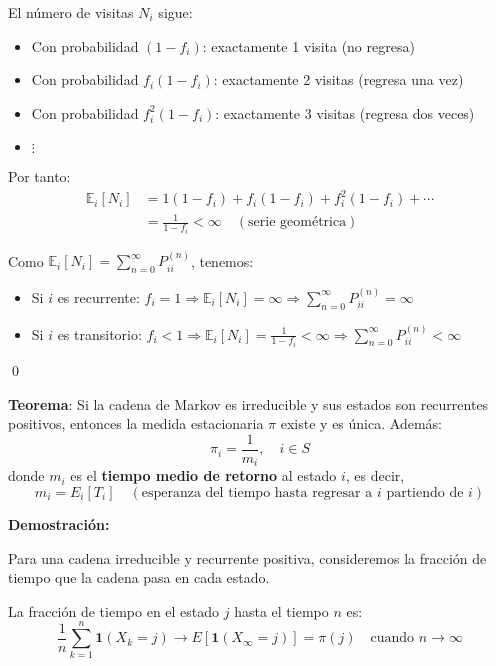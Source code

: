 \documentclass[12pt,a4paper]{article}
\newcommand{\teorema}[1]{%
\begin{teoremabox}
\textbf{Teorema}: #1
\end{teoremabox}
}
\begin{document}
El número de visitas $N_i$ sigue:
\begin{itemize}
\item Con probabilidad $(1-f_{i})$: exactamente 1 visita (no regresa)
\item Con probabilidad $f_{i}(1-f_{i})$: exactamente 2 visitas (regresa una vez)
\item Con probabilidad $f_{i}^2(1-f_{i})$: exactamente 3 visitas (regresa dos veces)
\item $\vdots$
\end{itemize}

Por tanto:
\begin{align*}
\mathbb{E}_i[N_i] &= 1(1-f_i) + f_i(1- f_i) + f^2_i(1-f_i) + \cdots \\
&= \frac{1}{1-f_{i}} < \infty \quad (\text{serie geométrica})
\end{align*}

Como $\mathbb{E}_i[N_i] = \sum_{n=0}^{\infty} P_{ii}^{(n)}$, tenemos:
\begin{itemize}
\item Si $i$ es recurrente: $f_i = 1 \Rightarrow \mathbb{E}_i[N_i] = \infty \Rightarrow \sum_{n=0}^{\infty} P_{ii}^{(n)} = \infty$
\item Si $i$ es transitorio: $f_i < 1 \Rightarrow \mathbb{E}_i[N_i] = \frac{1}{1-f_i} < \infty \Rightarrow \sum_{n=0}^{\infty} P_{ii}^{(n)} < \infty$
\end{itemize}

\qed

\teorema{Si la cadena de Markov es irreducible y sus estados son recurrentes positivos, entonces la medida estacionaria $\pi$ existe y es única. Además:
\begin{equation*}
\pi_i = \frac{1}{m_i}, \quad i \in S
\end{equation*}
donde $m_i$ es el \textbf{tiempo medio de retorno} al estado $i$, es decir,
\begin{equation*}
m_i = E_i[T_i] \quad (\text{esperanza del tiempo hasta regresar a $i$ partiendo de $i$})
\end{equation*}
}

\textbf{Demostración:}

Para una cadena irreducible y recurrente positiva, consideremos la fracción de tiempo que la cadena pasa en cada estado.

La fracción de tiempo en el estado $j$ hasta el tiempo $n$ es:
\begin{equation*}
\frac{1}{n} \sum_{k=1}^{n} \mathbf{1}(X_k = j) \to E[\mathbf{1}(X_\infty = j)] = \pi(j) \quad \text{cuando } n \to \infty
\end{equation*}
\end{document}
